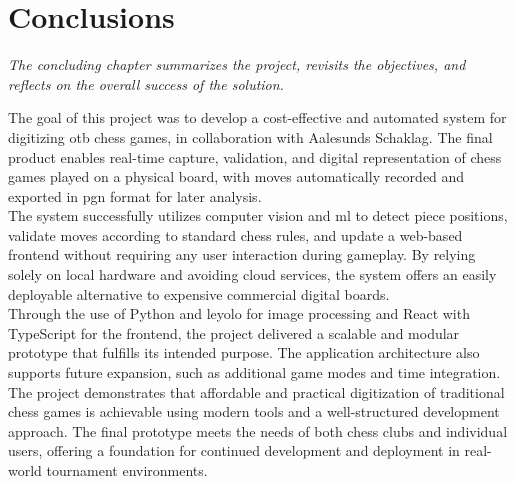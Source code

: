 \chapter{Conclusions}

\begin{center}
    \textit{The concluding chapter summarizes the project, revisits the objectives, and reflects on the overall success of the solution.}
\end{center}

The goal of this project was to develop a cost-effective and automated system for digitizing \gls{otb} chess games, in collaboration with Aalesunds Schaklag. The final product enables real-time capture, validation, and digital representation of chess games played on a physical board, with moves automatically recorded and exported in \gls{pgn} format for later analysis. \\

The system successfully utilizes computer vision and \gls{ml} to detect piece positions, validate moves according to standard chess rules, and update a web-based frontend without requiring any user interaction during gameplay. By relying solely on local hardware and avoiding cloud services, the system offers an easily deployable alternative to expensive commercial digital boards. \\

Through the use of Python and \gls{leyolo} for image processing and React with TypeScript for the frontend, the project delivered a scalable and modular prototype that fulfills its intended purpose. The application architecture also supports future expansion, such as additional game modes and time integration. \\

The project demonstrates that affordable and practical digitization of traditional chess games is achievable using modern tools and a well-structured development approach. The final prototype meets the needs of both chess clubs and individual users, offering a foundation for continued development and deployment in real-world tournament environments.